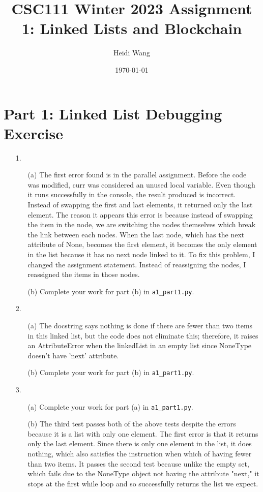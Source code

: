 \documentclass[11pt]{article}
\title{CSC111 Winter 2023 Assignment 1: Linked Lists and Blockchain}
\author{Heidi Wang}
\date{\today}
\begin{document}
\maketitle

\section*{Part 1: Linked List Debugging Exercise}

\begin{enumerate}
\item[1.]
\begin{enumerate}
    \item[(a)]
    The first error found is in the parallel assignment. Before the code was modified, curr was considered an unused local variable. Even though it runs successfully in the console, the result produced is incorrect. Instead of swapping the first and last elements, it returned only the last element. The reason it appears this error is because instead of swapping the item in the node, we are switching the nodes themselves which break the link between each nodes. When the last node, which has the next attribute of None, becomes the first element, it becomes the only element in the list because it has no next node linked to it. To fix this problem, I changed the assignment statement. Instead of reassigning the nodes, I reassigned the items in those nodes.

    \item[(b)]
    Complete your work for part (b) in \texttt{a1\_part1.py}.
\end{enumerate}

\item[2.]
\begin{enumerate}
    \item[(a)]
    The docstring says nothing is done if there are fewer than two items in this linked list, but the code does not eliminate this; therefore, it raises an AttributeError when the linkedList in an empty list since NoneType doesn't have 'next' attribute.
    \item[(b)]
    Complete your work for part (b) in \texttt{a1\_part1.py}.
\end{enumerate}

\item[3.]
\begin{enumerate}
    \item[(a)]
    Complete your work for part (a) in \texttt{a1\_part1.py}.
    \item[(b)]
    The third test passes both of the above tests despite the errors because it is a list with only one element. The first error is that it returns only the last element. Since there is only one element in the list, it does nothing, which also satisfies the instruction when which of having fewer than two items. It passes the second test because unlike the empty set, which fails due to the NoneType object not having the attribute "next," it stops at the first while loop and so successfully returns the list we expect.
\end{enumerate}


\end{enumerate}
\end{document}
